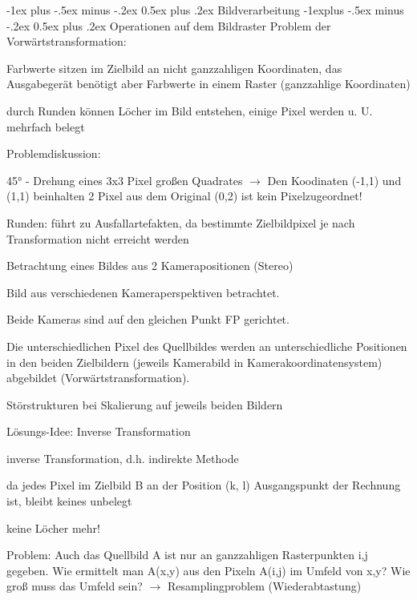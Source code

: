 \documentclass[landscape]{article}
\makeatletter
\renewcommand{\section}{\@startsection{section}{1}{0mm}%
                                {-1ex plus -.5ex minus -.2ex}%
                                {0.5ex plus .2ex}%
                                {\normalfont\large\bfseries}}
\renewcommand{\subsection}{\@startsection{subsection}{2}{0mm}%
                                {-1explus -.5ex minus -.2ex}%
                                {0.5ex plus .2ex}%
                                {\normalfont\normalsize\bfseries}}
\makeatother
\begin{document}
\newpage
\begin{multicols}{3}
  \section{Bildverarbeitung}
  \subsection{Operationen auf dem Bildraster}
  Problem der Vorwärtstransformation:
  \begin{itemize*}
    \item Farbwerte sitzen im Zielbild an nicht ganzzahligen Koordinaten, das Ausgabegerät benötigt aber Farbwerte in einem Raster (ganzzahlige Koordinaten)
    \item durch Runden können Löcher im Bild entstehen, einige Pixel werden u. U. mehrfach belegt
  \end{itemize*}
  
  
  Problemdiskussion: 
  \begin{itemize*}
    \item 45° - Drehung eines 3x3 Pixel großen Quadrates $\rightarrow$ Den Koodinaten (-1,1) und (1,1) beinhalten 2 Pixel aus dem Original (0,2) ist kein Pixelzugeordnet!
    \item Runden: führt zu Ausfallartefakten, da bestimmte Zielbildpixel je nach Transformation nicht erreicht werden
    \item Betrachtung eines Bildes aus 2 Kamerapositionen (Stereo)
    \begin{itemize*}
      \item Bild aus verschiedenen Kameraperspektiven betrachtet.
      \item Beide Kameras sind auf den gleichen Punkt FP gerichtet.
      \item Die unterschiedlichen Pixel des Quellbildes werden an unterschiedliche Positionen in den beiden Zielbildern (jeweils Kamerabild in Kamerakoordinatensystem) abgebildet (Vorwärtstransformation).
      \item Störstrukturen bei Skalierung auf jeweils beiden Bildern
    \end{itemize*}
  \end{itemize*}
  
  Lösungs-Idee: Inverse Transformation
  \begin{itemize*}
    \item inverse Transformation, d.h. indirekte Methode
    \item da jedes Pixel im Zielbild B an der Position (k, l) Ausgangspunkt der Rechnung ist, bleibt keines unbelegt
    \item keine Löcher mehr!
    \item Problem: Auch das Quellbild A ist nur an ganzzahligen Rasterpunkten i,j gegeben. Wie ermittelt man A(x,y) aus den Pixeln A(i,j) im Umfeld von x,y? Wie groß muss das Umfeld sein? $\rightarrow$ Resamplingproblem (Wiederabtastung)
  \end{itemize*}
  

\end{multicols}
\end{document}
